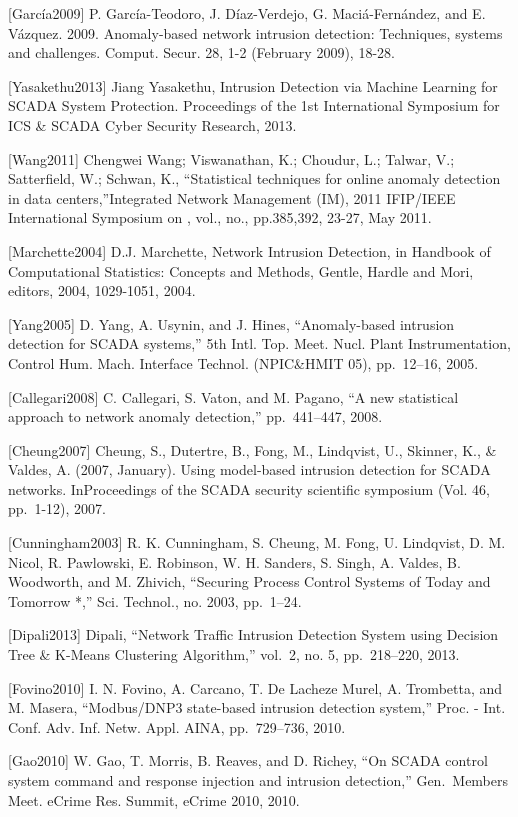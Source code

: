 \documentclass[12pt,]{article}
\begin{document}
{[}García2009{]} P. García-Teodoro, J. Díaz-Verdejo, G. Maciá-Fernández,
and E. Vázquez. 2009. Anomaly-based network intrusion detection:
Techniques, systems and challenges. Comput. Secur. 28, 1-2 (February
2009), 18-28.

{[}Yasakethu2013{]} Jiang Yasakethu, Intrusion Detection via Machine
Learning for SCADA System Protection. Proceedings of the 1st
International Symposium for ICS \& SCADA Cyber Security Research, 2013.

{[}Wang2011{]} Chengwei Wang; Viswanathan, K.; Choudur, L.; Talwar, V.;
Satterfield, W.; Schwan, K., ``Statistical techniques for online anomaly
detection in data centers,''Integrated Network Management (IM), 2011
IFIP/IEEE International Symposium on , vol., no., pp.385,392, 23-27, May
2011.

{[}Marchette2004{]} D.J. Marchette, Network Intrusion Detection, in
Handbook of Computational Statistics: Concepts and Methods, Gentle,
Hardle and Mori, editors, 2004, 1029-1051, 2004.

{[}Yang2005{]} D. Yang, A. Usynin, and J. Hines, ``Anomaly-based
intrusion detection for SCADA systems,'' 5th Intl. Top. Meet. Nucl.
Plant Instrumentation, Control Hum. Mach. Interface Technol. (NPIC\&HMIT
05), pp.~12--16, 2005.

{[}Callegari2008{]} C. Callegari, S. Vaton, and M. Pagano, ``A new
statistical approach to network anomaly detection,'' pp.~441--447, 2008.

{[}Cheung2007{]} Cheung, S., Dutertre, B., Fong, M., Lindqvist, U.,
Skinner, K., \& Valdes, A. (2007, January). Using model-based intrusion
detection for SCADA networks. InProceedings of the SCADA security
scientific symposium (Vol. 46, pp.~1-12), 2007.

{[}Cunningham2003{]} R. K. Cunningham, S. Cheung, M. Fong, U. Lindqvist,
D. M. Nicol, R. Pawlowski, E. Robinson, W. H. Sanders, S. Singh, A.
Valdes, B. Woodworth, and M. Zhivich, ``Securing Process Control Systems
of Today and Tomorrow *,'' Sci. Technol., no. 2003, pp.~1--24.

{[}Dipali2013{]} Dipali, ``Network Traffic Intrusion Detection System
using Decision Tree \& K-Means Clustering Algorithm,'' vol.~2, no. 5,
pp.~218--220, 2013.

{[}Fovino2010{]} I. N. Fovino, A. Carcano, T. De Lacheze Murel, A.
Trombetta, and M. Masera, ``Modbus/DNP3 state-based intrusion detection
system,'' Proc. - Int. Conf. Adv. Inf. Netw. Appl. AINA, pp.~729--736,
2010.

{[}Gao2010{]} W. Gao, T. Morris, B. Reaves, and D. Richey, ``On SCADA
control system command and response injection and intrusion detection,''
Gen.~Members Meet. eCrime Res. Summit, eCrime 2010, 2010.
\end{document}
